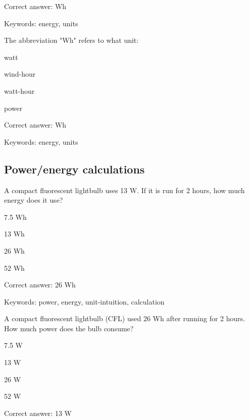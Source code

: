 Correct answer: Wh

Keywords: energy, units

\begin{question}
	\item The abbreviation "Wh" refers to what unit:
\end{question}

\begin{answer}
	\item watt
	\item wind-hour
	\item watt-hour
	\item power
\end{answer}

Correct answer: Wh

Keywords: energy, units

\subsection{Power/energy calculations}

\begin{question}
	\item A compact fluorescent lightbulb uses 13 W. If it is run for 2 hours, how much energy does it use?
\end{question}

\begin{answer}
	\item 7.5 Wh
	\item 13 Wh
	\item 26 Wh
	\item 52 Wh
\end{answer}

Correct answer: 26 Wh

Keywords: power, energy, unit-intuition, calculation

\begin{question}
	\item A compact fluorescent lightbulb (CFL) used 26 Wh after running for 2 hours. How much power does the bulb consume?
\end{question}

\begin{answer}
	\item 7.5 W
	\item 13 W
	\item 26 W
	\item 52 W
\end{answer}

Correct answer: 13 W

